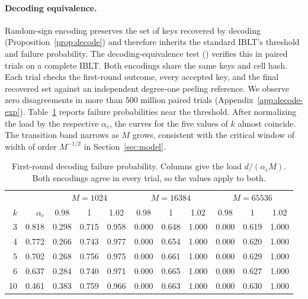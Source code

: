 \paragraph{Decoding equivalence.}
Random-sign encoding preserves the set of keys recovered by decoding (Proposition~\ref{prop:decode}) and therefore inherits the standard IBLT's threshold and failure probability. The decoding-equivalence test () verifies this in paired trials on a complete IBLT. Both encodings share the same keys and cell hash. Each trial checks the first-round outcome, every accepted key, and the final recovered set against an independent degree-one peeling reference. We observe zero disagreements in more than 500 million paired trials (Appendix~\ref{app:decode-exp}). Table~\ref{tab:decode} reports failure probabilities near the threshold. After normalizing the load by the respective $\alpha_c$, the curves for the five values of $k$ almost coincide. The transition band narrows as $M$ grows, consistent with the critical window of width of order $M^{-1/2}$ in Section~\ref{sec:model}.

\begin{table}[!htbp]
\centering
\caption{First-round decoding failure probability. Columns give the load $d/(\alpha_cM)$. Both encodings agree in every trial, so the values apply to both.}
\label{tab:decode}
\begin{tabular}{rr@{\hspace{1.2em}}ccc@{\hspace{1.2em}}ccc@{\hspace{1.2em}}ccc}
\toprule
& & \multicolumn{3}{c}{$M=1024$} & \multicolumn{3}{c}{$M=16384$} & \multicolumn{3}{c}{$M=65536$}\\
\cmidrule(lr){3-5}\cmidrule(lr){6-8}\cmidrule(lr){9-11}
$k$ & $\alpha_c$ & 0.98 & 1 & 1.02 & 0.98 & 1 & 1.02 & 0.98 & 1 & 1.02\\
\midrule
3 & 0.818 & 0.298 & 0.715 & 0.958 & 0.000 & 0.648 & 1.000 & 0.000 & 0.619 & 1.000\\
4 & 0.772 & 0.266 & 0.743 & 0.977 & 0.000 & 0.654 & 1.000 & 0.000 & 0.620 & 1.000\\
5 & 0.702 & 0.268 & 0.756 & 0.975 & 0.000 & 0.661 & 1.000 & 0.000 & 0.629 & 1.000\\
6 & 0.637 & 0.284 & 0.740 & 0.971 & 0.000 & 0.665 & 1.000 & 0.000 & 0.627 & 1.000\\
10 & 0.461 & 0.383 & 0.759 & 0.966 & 0.000 & 0.663 & 1.000 & 0.000 & 0.630 & 1.000\\
\bottomrule
\end{tabular}
\end{table}


